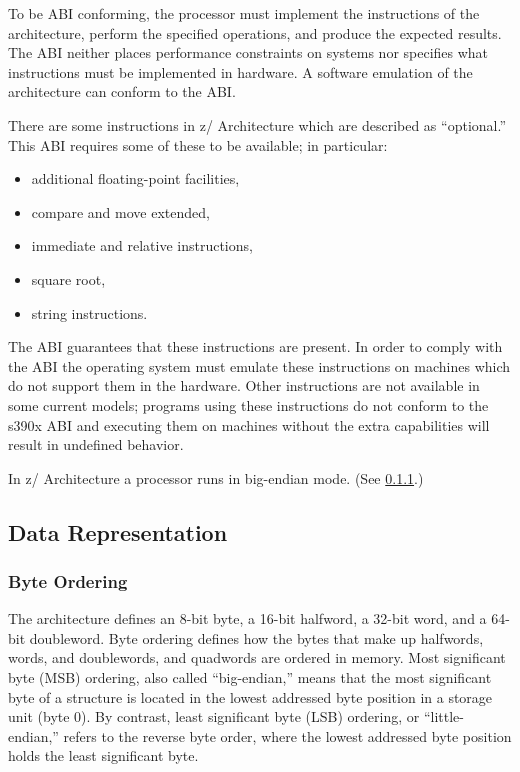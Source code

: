 \documentclass[english,11pt,twoside,toc=bib,toc=idx]{scrreprt}
\newcommand{\ABINAME}{s390x}
\newcommand{\ARCH}{z/\kern-1pt Ar\-chi\-tec\-ture}
\newcommand{\ARCHarch}{\ARCH}
\newcommand{\ABINAME}{s390}
\newcommand{\ARCH}{ESA/390}
\newcommand{\ARCHarch}{the \ARCH{} ar\-chi\-tec\-ture}
\begin{document}
To be ABI conforming, the processor must implement the instructions of
the architecture, perform the specified operations, and produce the
expected results.  The ABI neither places performance constraints on
systems nor specifies what instructions must be implemented in
hardware.  A software emulation of the architecture can conform to
the ABI\@.

{\ifzseries\else
  There are some instructions in \ARCHarch{}
  which are described as ``optional.''  This ABI
  requires some of these to be available; in particular:
  \begin{itemize}
  \item additional floating-point facilities, %
  \item compare and move extended,
  \item immediate and relative instructions,
  \item square root,
  \item string instructions.
  \end{itemize}

  The ABI guarantees that these instructions are present.  In order to
  comply with the ABI the operating system must emulate these
  instructions on machines which do not support them in the hardware.
  Other instructions are not available in some current models; programs
  using these instructions do not conform to the \ABINAME{} ABI and
  executing them on machines without the extra capabilities will result
  in undefined behavior.  \fi}

In \ARCHarch{} a
processor runs in big-endian mode.  (See \cref{byteordering}.)

\subsection{Data Representation}
\subsubsection{Byte Ordering}
\label{byteordering}

The architecture defines an 8-bit byte,
a 16-bit halfword,
a 32-bit word,{\ifzseries\else{} and\fi}
a 64-bit doubleword.
Byte ordering defines how the bytes that make up halfwords,
words,{\ifzseries\else{} and\fi} doublewords{\ifzseries , and
  quadwords\fi} are ordered in memory.  Most significant byte (MSB)
ordering, also called ``big-endian,'' means that
the most significant byte
of a structure is located in the lowest addressed byte position in a
storage unit (byte 0).  By contrast, least significant byte (LSB)
ordering, or ``little-endian,'' refers to the
reverse byte order, where
the lowest addressed byte position holds the least significant byte.
\end{document}
